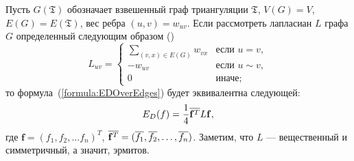 Пусть $G(\mathfrak{T})$ обозначает взвешенный граф триангуляции $\mathfrak{T}$, $V(G) = V$, $E(G) = E(\mathfrak{T})$, вес ребра $(u, v) = w_{uv}$. 
Если рассмотреть лапласиан $L$ графа $G$ определенный следующим образом (\cite{Chen}) 
$$ L_{uv} = \begin{cases}
  \sum_{(v, x) \in E(G)}{w_{vx}}&\text{если $u = v,$} \\
  -w_{uv}&\text{если $u \sim v,$} \\
  0 &\text{иначе;}
\end{cases}
$$ то формула~(\ref{formula:EDOverEdges}) будет эквивалентна следующей:
\begin{equation}
  \label{formula:EDOverLaplacian}
  E_D(f) = \frac{1}{4} \overline{\mathbf{f}^T} L \mathbf{f},
\end{equation}
где $\mathbf{f} = (f_1, f_2, \dots f_n)^T$, $\overline{\mathbf{f}^T} = 
(\overline{f_1}, \overline{f_2}, \dots, \overline{f_n})$. Заметим, что $L$ --- вещественный и 
симметричный, а значит, эрмитов.

